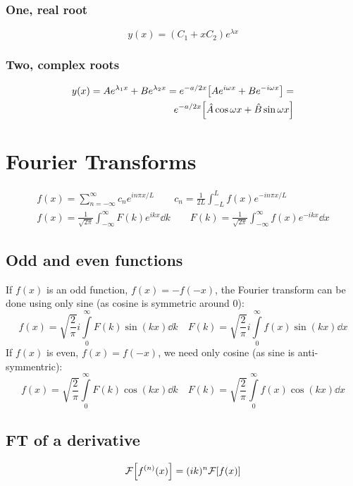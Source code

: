 \documentclass[10pt,a4paper]{article}
\renewcommand{\exp}{e^}
\newcommand{\infint}{\int_{-\infty}^{\infty}}
\begin{document}
\begin{multicols}{2}
\subsubsection*{One, real root}
\[
    y(x) = (C_1 + xC_2)\exp{\lambda x}
\]


\subsubsection*{Two, complex roots}
\begin{equation*}
\begin{split}
    y(x) = A\exp{\lambda_1 x} + B\exp{\lambda_2 x} = \exp{-a/2 x}\qty[A\exp{i\omega x} + B\exp{-i\omega x}] =\\
    \exp{-a/2 x}\qty[\hat{A}\cos{\omega x} + \hat{B}\sin{\omega x}]
\end{split}
\end{equation*}






\newpage


\section*{Fourier Transforms}
\begin{gather*}
    f(x) = \sum_{n=-\infty}^{\infty} c_n \exp{in\pi x/L}  \quad\quad
    c_n = \frac{1}{2L}\int_{-L}^L f(x) \exp{-in\pi x/L}\\
    f(x) = \frac{1}{\sqrt{2\pi}} \infint F(k) \exp{ikx} \dd{k} \quad\quad
    F(k) = \frac{1}{\sqrt{2\pi}} \infint f(x) \exp{-ikx} \dd{x}
\end{gather*}


\subsection*{Odd and even functions}
If $f(x)$ is an odd function, $f(x) = -f(-x)$, the Fourier transform can be done using only sine (as cosine is symmetric around 0):
\[
    f(x) = \sqrt{\frac{2}{\pi}} i\int\limits_0^{\infty} F(k) \sin(k x) \dd{k}   \quad
    F(k) = \sqrt{\frac{2}{\pi}} i\int\limits_0^{\infty} f(x) \sin(k x) \dd{x}
\]
If $f(x)$ is even, $f(x) = f(-x)$, we need only cosine (as sine is anti-symmentric):
\[
    f(x) = \sqrt{\frac{2}{\pi}} \int\limits_0^{\infty} F(k) \cos(k x) \dd{k}   \quad
    F(k) = \sqrt{\frac{2}{\pi}} \int\limits_0^{\infty} f(x) \cos(k x) \dd{x}
\]


\subsection*{FT of a derivative}
\[
    \mathcal{F}\qty[f^{(n)}(x)] = (ik)^n \mathcal{F}\qty[f(x)]
\]
\newpage

\end{multicols}
\end{document}
